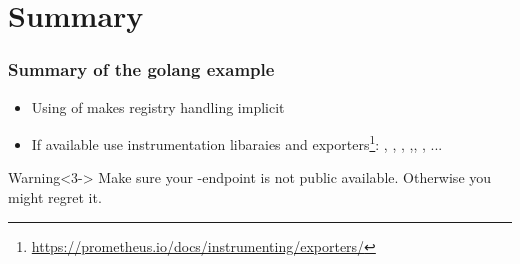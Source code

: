 \section{Summary}
\begin{frame}
  \frametitle{Summary of the golang example} 
 
    \begin{itemize}
     \item<1-> Using of  makes registry handling implicit 
     \item<2-> If available use instrumentation libaraies and exporters\footnote{\url{https://prometheus.io/docs/instrumenting/exporters/}}: , , , ,, , ...
    \end{itemize}

 
   \begin{block}{Warning}<3->
   Make sure your -endpoint is not public available. Otherwise you might regret it.
  \end{block}
  

\end{frame}
